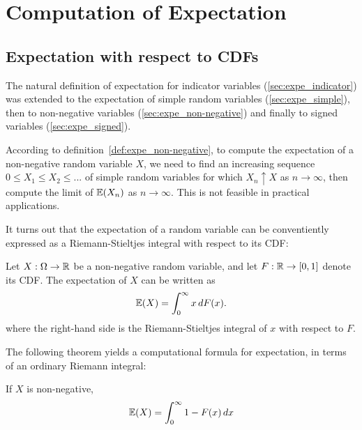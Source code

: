 \chapter{Computation of Expectation}\label{chap:comp_expe}
\section{Expectation with respect to CDFs}
The natural definition of expectation for indicator variables (\ref{sec:expe_indicator}) was extended to the expectation of simple random variables (\ref{sec:expe_simple}), then to non-negative variables (\ref{sec:expe_non-negative}) and finally to signed variables (\ref{sec:expe_signed}).

\bigskip
According to definition~\ref{def:expe_non-negative}, to compute the expectation of a non-negative random variable $X$, we need to find an increasing sequence $0\leq X_1\leq X_2\leq ...$ of simple random variables for which $X_n\uparrow X$ as $n\to\infty$, then compute the limit of $\mathbb{E}(X_n)$ as $n\to\infty$. This is not feasible in practical applications.

\bigskip
It turns out that the expectation of a random variable can be conventiently expressed as a Riemann-Stieltjes integral with respect to its CDF:
\begin{theorem}\label{thm:expe_riemann_stieltjes}
Let $X:\Omega\to\mathbb{R}$ be a non-negative random variable, and let $F:\mathbb{R}\to[0,1]$ denote its CDF. The expectation of $X$ can be written as
\[
\mathbb{E}(X) = \int_{0}^{\infty} x\,dF(x).
\]
where the right-hand side is the Riemann-Stieltjes integral of $x$ with respect to $F$.
\end{theorem}
\proofomitted

\bigskip
The following theorem yields a computational formula for expectation, in terms of an ordinary Riemann integral:
\begin{theorem}\label{thm:expe_wrt_cdf_comp}
If $X$ is non-negative,
\[
\mathbb{E}(X) = \int_{0}^{\infty} 1 - F(x)\,dx
\]
\end{theorem}
\proofomitted

